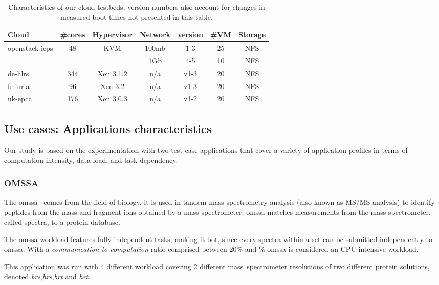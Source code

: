 \begin{table}
	\begin{tabular}{|l|c|c|c|c|c|c|}
		\hline
		Cloud&\#cores&Hypervisor&Network&version&\#VM&Storage\\ \hline
		\multirow{2}{*}{openstack-icps}&\multirow{2}{*}{48}&
                \multirow{2}{*}{KVM}&100mb&1-3&25&NFS\\\cline{4-7}
		&&&1Gb&4-5&10&NFS\\\hline
		de-hlrs&344&Xen 3.1.2&n/a&v1-3&20&NFS\\\hline
		fr-inria&96&Xen 3.2&n/a&v1-3&20&NFS\\\hline
		uk-epcc&176&Xen 3.0.3&n/a&v1-2&20&NFS\\\hline

	\end{tabular}
	\caption{Characteristics of our cloud testbeds, version numbers also
	account for changes in measured boot times not presented in this table.}
	\label{tab:platforms}
\end{table}


\subsection{Use cases: Applications characteristics}
\label{sc:app}

Our study is  based on the experimentation with two  test-case applications that
cover a variety of application profiles  in terms of computation intensity, data
load, and task dependency.

\subsubsection{OMSSA}

The \ac{omssa}~\cite{Geer2004}  comes from the  field of  biology, it is  used in
tandem mass  spectrometry analysis  (also known as  MS/MS analysis)  to identify
peptides   from   the   mass   and    fragment   ions   obtained   by   a   mass
spectrometer. \ac{omssa} matches measurements from the mass spectrometer, called
spectra, to a protein database.

The \ac{omssa}  workload features fully  independent tasks, making  it \ac{bot},
since every spectra  within a set can be submitted  independently to \ac{omssa}.
With a  \emph{communication-to-computation} ratio comprised between  20\% and \%
\ac{omssa} is considered an CPU-intensive workload.

This application was run with 4 different workload covering 2 different
mass~spectrometer resolutions of two different protein solutions, denoted
\emph{brs},\emph{hrs},\emph{brt} and \emph{hrt}.


